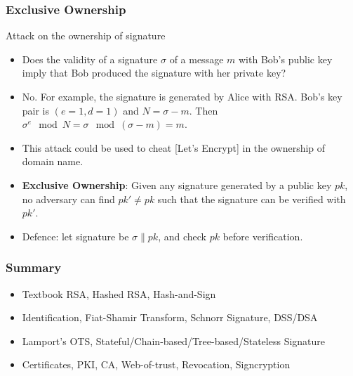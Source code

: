 \begin{frame}\frametitle{Exclusive Ownership}
\begin{exampleblock}{Attack on the ownership of signature}
\begin{itemize}
\item Does the validity of a signature $\sigma$ of a message $m$ with Bob's public key imply that Bob produced the signature with her private key?
\item No. For example, the signature is generated by Alice with RSA. Bob's key pair is $(e=1, d=1)$ and $N = \sigma - m$. Then $\sigma^e \mod N = \sigma \mod (\sigma - m) = m$.
\item This attack could be used to cheat [Let's Encrypt] in the ownership of domain name.
\end{itemize}
\end{exampleblock}
\begin{itemize}
\item \textbf{Exclusive Ownership}: Given any signature generated by a public key $pk$, no adversary can find $pk' \neq pk$ such that the signature can be verified with $pk'$.
\item Defence: let signature be $\sigma \| pk$, and check $pk$ before verification.
\end{itemize}
\end{frame}
\begin{frame}\frametitle{Summary}
\begin{itemize}
\item Textbook RSA, Hashed RSA, Hash-and-Sign
\item Identification, Fiat-Shamir Transform, Schnorr Signature, DSS/DSA
\item Lamport's OTS, Stateful/Chain-based/Tree-based/Stateless Signature
\item Certificates, PKI, CA, Web-of-trust, Revocation, Signcryption
\end{itemize}
\end{frame}

